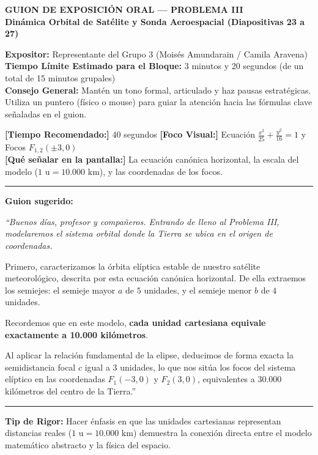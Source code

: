 \documentclass[12pt,letterpaper]{article}
\begin{document}
\begin{center}
    \begin{tcolorbox}[colback=USSBlue, colframe=USSBlue, sharp corners, halign=center, valign=center, colupper=white, bottom=1.5mm, top=1.5mm]
        \Large\bfseries GUION DE EXPOSICIÓN ORAL --- PROBLEMA III \\
        \large\mdseries Dinámica Orbital de Satélite y Sonda Aeroespacial (Diapositivas 23 a 27)
    \end{tcolorbox}
\end{center}

\vspace{0.2cm}
\noindent\textbf{Expositor:} Representante del Grupo 3 (Moisés Amundarain / Camila Aravena) \\
\textbf{Tiempo Límite Estimado para el Bloque:} 3 minutos y 20 segundos (de un total de 15 minutos grupales) \\
\textbf{Consejo General:} Mantén un tono formal, articulado y haz pausas estratégicas. Utiliza un puntero (físico o mouse) para guiar la atención hacia las fórmulas clave señaladas en el guion.

\vspace{0.4cm}

\begin{tcolorbox}[colframe=USSBlue, colback=white, title=\textbf{DIAPOSITIVA 23: Elementos de la Órbita Elíptica (Pág. 23)}, coltitle=white]
    \small
    \textbf{[Tiempo Recomendado:]} 40 segundos \hfill \textbf{[Foco Visual:]} Ecuación $\frac{x^2}{25} + \frac{y^2}{16} = 1$ y Focos $F_{1,2}(\pm 3, 0)$ \\
    \textbf{[Qué señalar en la pantalla:]} La ecuación canónica horizontal, la escala del modelo ($1\text{ u} = 10.000\text{ km}$), y las coordenadas de los focos.
    \hrule\vspace{0.2cm}
    \textbf{Guion sugerido:}
    \medskip
    
    {\itshape
    ``Buenos días, profesor y compañeros. Entrando de lleno al Problema III, modelaremos el sistema orbital donde la Tierra se ubica en el origen de coordenadas. 
    
    Primero, caracterizamos la órbita elíptica estable de nuestro satélite meteorológico, descrita por esta ecuación canónica horizontal. De ella extraemos los semiejes: el semieje mayor $a$ de $5$ unidades, y el semieje menor $b$ de $4$ unidades. 
    
    Recordemos que en este modelo, \textbf{cada unidad cartesiana equivale exactamente a 10.000 kilómetros}. 
    
    Al aplicar la relación fundamental de la elipse, deducimos de forma exacta la semidistancia focal $c$ igual a $3$ unidades, lo que nos sitúa los focos del sistema elíptico en las coordenadas $F_1(-3,0)$ y $F_2(3,0)$, equivalentes a 30.000 kilómetros del centro de la Tierra.''}
    \vspace{0.2cm}\hrule\vspace{0.15cm}
    \textbf{Tip de Rigor:} Hacer énfasis en que las unidades cartesianas representan distancias reales ($1\text{ u} = 10.000\text{ km}$) demuestra la conexión directa entre el modelo matemático abstracto y la física del espacio.
\end{tcolorbox}
\end{document}
